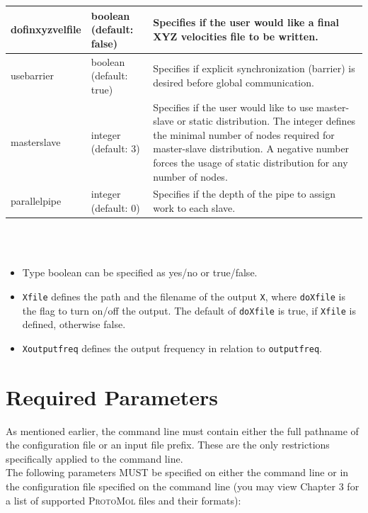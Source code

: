 \documentclass[11pt]{report}
\newcommand{\ProtoMol}{\textsc{ProtoMol }}
\providecommand{\ttsmall}[1]{\texttt{\small\mbox{#1}}}
\begin{document}
\begin{tabular}{|p{5.5cm}|p{4cm}|p{6cm}|}
   
    dofinxyzvelfile &
    boolean (default: false) &
    Specifies if the user would like a final XYZ velocities file to be written. \\\hline

    usebarrier &
    boolean (default: true) &
    Specifies if explicit synchronization (barrier) is desired before
    global communication. \\\hline

    masterslave &
    integer (default: 3) &
    Specifies if the user would like to use master-slave or static
    distribution. The integer defines the minimal number of nodes
    required for master-slave distribution. A negative number forces the usage of static
    distribution for any number of nodes.\\\hline

    parallelpipe &
    integer (default: 0) &
    Specifies if the depth of the pipe to assign work to each slave.\\\hline



    
\end{tabular}
\\
\\
\begin{itemize}
\item Type boolean can be specified as yes/no or true/false.
\item \ttsmall{Xfile} defines the path and the filename of the output \ttsmall{X},
where \ttsmall{doXfile} is the flag to turn on/off the output. The
default of  \ttsmall{doXfile}  is true, if \ttsmall{Xfile} is defined,
otherwise false.
\item \ttsmall{Xoutputfreq} defines the output frequency in relation
to \ttsmall{outputfreq}.
\end{itemize}
  \newpage

\section{Required Parameters}

As mentioned earlier, the command line must contain either the full
pathname of the configuration file or an input file prefix.  These are
the only restrictions specifically applied to the command line. \\ 

The following parameters MUST be specified on either the command line
or in the configuration file specified on the command line (you may
view Chapter 3 for a list of supported \ProtoMol files and their
formats):
\end{document}
